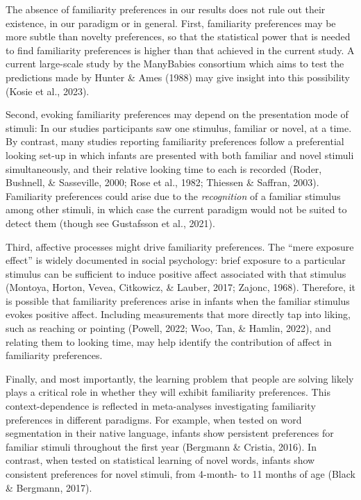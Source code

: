 \documentclass[10pt, letterpaper]{article}
\begin{document}
The absence of familiarity preferences in our results does not rule out
their existence, in our paradigm or in general. First, familiarity
preferences may be more subtle than novelty preferences, so that the
statistical power that is needed to find familiarity preferences is
higher than that achieved in the current study. A current large-scale
study by the ManyBabies consortium which aims to test the predictions
made by Hunter \& Ames (1988) may give insight into this possibility
(Kosie et al., 2023).

Second, evoking familiarity preferences may depend on the presentation
mode of stimuli: In our studies participants saw one stimulus, familiar
or novel, at a time. By contrast, many studies reporting familiarity
preferences follow a preferential looking set-up in which infants are
presented with both familiar and novel stimuli simultaneously, and their
relative looking time to each is recorded (Roder, Bushnell, \&
Sasseville, 2000; Rose et al., 1982; Thiessen \& Saffran, 2003).
Familiarity preferences could arise due to the \emph{recognition} of a
familiar stimulus among other stimuli, in which case the current
paradigm would not be suited to detect them (though see Gustafsson et
al., 2021).

Third, affective processes might drive familiarity preferences. The
``mere exposure effect'' is widely documented in social psychology:
brief exposure to a particular stimulus can be sufficient to induce
positive affect associated with that stimulus (Montoya, Horton, Vevea,
Citkowicz, \& Lauber, 2017; Zajonc, 1968). Therefore, it is possible
that familiarity preferences arise in infants when the familiar stimulus
evokes positive affect. Including measurements that more directly tap
into liking, such as reaching or pointing (Powell, 2022; Woo, Tan, \&
Hamlin, 2022), and relating them to looking time, may help identify the
contribution of affect in familiarity preferences.

Finally, and most importantly, the learning problem that people are
solving likely plays a critical role in whether they will exhibit
familiarity preferences. This context-dependence is reflected in
meta-analyses investigating familiarity preferences in different
paradigms. For example, when tested on word segmentation in their native
language, infants show persistent preferences for familiar stimuli
throughout the first year (Bergmann \& Cristia, 2016). In contrast, when
tested on statistical learning of novel words, infants show consistent
preferences for novel stimuli, from 4-month- to 11 months of age (Black
\& Bergmann, 2017).
\end{document}
